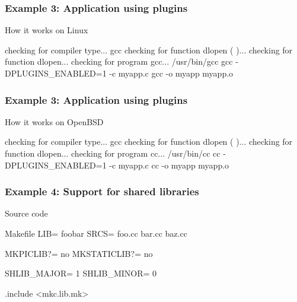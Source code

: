 \documentclass[hyperref={colorlinks=true}]{beamer}
\begin{document}
\begin{frame}[fragile]
  \frametitle{Example 3: Application using plugins}

  \begin{block}{How it works on Linux}
\begin{CodeNoLabel}
checking for compiler type... gcc
checking for function dlopen (  )... 
checking for function dlopen... 
checking for program gcc... /usr/bin/gcc
gcc -DPLUGINS_ENABLED=1    -c myapp.c
gcc   -o myapp myapp.o 
\prompt{\$}
\end{CodeNoLabel}
  \end{block}
\end{frame}

\begin{frame}[fragile]
  \frametitle{Example 3: Application using plugins}

  \begin{block}{How it works on OpenBSD}
\begin{CodeNoLabel}
checking for compiler type... gcc
checking for function dlopen (  )... 
checking for function dlopen... 
checking for program cc... /usr/bin/cc
cc  -DPLUGINS_ENABLED=1    -c myapp.c
cc   -o myapp myapp.o
\prompt{\$}
\end{CodeNoLabel}
  \end{block}
\end{frame}

\begin{frame}[fragile]
  \frametitle{Example 4: Support for shared libraries}

  \begin{block}{Source code}
  \begin{Code}{Makefile}
LIB=                   foobar
SRCS=                  foo.cc bar.cc baz.cc

MKPICLIB?=             no
MKSTATICLIB?=          no

SHLIB_MAJOR=           1
SHLIB_MINOR=           0

.include <mkc.lib.mk>
  \end{Code}
  \end{block}
\end{frame}
\end{document}
